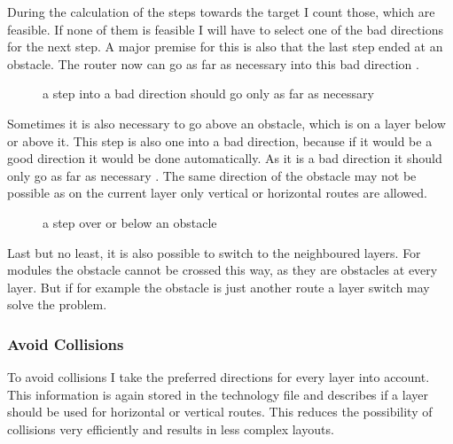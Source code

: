 During the calculation of the steps towards the target I count those, which are feasible. If none of them is feasible I will have to select one of the bad directions for the next step. A major premise for this is also that the last step ended at an obstacle. The router now can go as far as necessary into this bad direction .

\begin{figure}
	\centering
	
 	\caption{a step into a bad direction should go only as far as necessary}
	\label{fig:router_as_far_as_necessary}
\end{figure}

Sometimes it is also necessary to go above an obstacle, which is on a layer below or above it. This step is also one into a bad direction, because if it would be a good direction it would be done automatically. As it is a bad direction it should only go as far as necessary . The same direction of the obstacle may not be possible as on the current layer only vertical or horizontal routes are allowed.

\begin{figure}
	\centering
	
 	\caption{a step over or below an obstacle}
	\label{fig:router_as_far_as_necessary_above}
\end{figure}

Last but no least, it is also possible to switch to the neighboured layers. For modules the obstacle cannot be crossed this way, as they are obstacles at every layer. But if for example the obstacle is just another route a layer switch may solve the problem.

\subsubsection{Avoid Collisions}
To avoid collisions I take the preferred directions for every layer into account. This information is again stored in the technology file and describes if a layer should be used for horizontal or vertical routes. This reduces the possibility of collisions very efficiently and results in less complex layouts.

